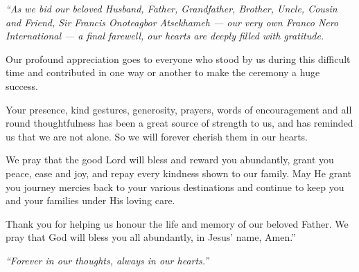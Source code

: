 \begin{center}

  {\coverface\fontsize{11.5}{14}\selectfont\color{primary}
  \par}

  \vspace{2.5mm}
  \diamondrule{16mm}{1.1mm}
  \vspace{3.5mm}

  \begin{minipage}{0.9\linewidth}
    \centering\coverface\fontsize{9.6}{11}\selectfont\itshape\color{primary}
    \setlength{\parskip}{2.0mm}\setlength{\parindent}{0pt}
    ``As we bid our beloved Husband, Father, Grandfather, Brother, Uncle,
    Cousin and Friend, Sir Francis Onoteagbor Atsekhameh --- our very own
    Franco Nero International --- a final farewell, our hearts are deeply
    filled with gratitude.

    Our profound appreciation goes to everyone who stood by us during this
    difficult time and contributed in one way or another to make the ceremony
    a huge success.

    Your presence, kind gestures, generosity, prayers, words of encouragement
    and all round thoughtfulness has been a great source of strength to us,
    and has reminded us that we are not alone. So we will forever cherish them
    in our hearts.

    We pray that the good Lord will bless and reward you abundantly, grant you
    peace, ease and joy, and repay every kindness shown to our family. May He
    grant you journey mercies back to your various destinations and continue
    to keep you and your families under His loving care.

    Thank you for helping us honour the life and memory of our beloved Father.
    We pray that God will bless you all abundantly, in Jesus' name, Amen.''
  \end{minipage}

  \vspace{4.5mm}

  {\coverdisplay\itshape\fontsize{12.5}{16}\selectfont\color{accent}
  ``Forever in our thoughts, always in our hearts.''\par}
\end{center}

